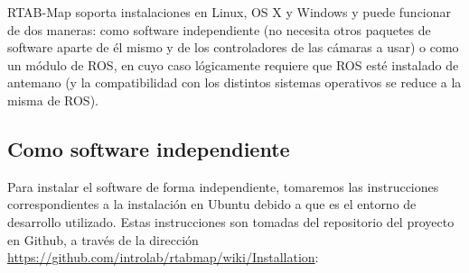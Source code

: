 RTAB-Map soporta instalaciones en Linux, OS X y Windows y puede funcionar de dos maneras: como software independiente (no necesita otros paquetes de software aparte de él mismo y de los controladores de las cámaras a usar) o como un módulo de ROS, en cuyo caso lógicamente requiere que ROS esté instalado de antemano (y la compatibilidad con los distintos sistemas operativos se reduce a la misma de ROS).

\subsection{Como software independiente}

Para instalar el software de forma independiente, tomaremos las instrucciones correspondientes a la instalación en Ubuntu debido a que es el entorno de desarrollo utilizado. Estas instrucciones son tomadas del repositorio del proyecto en Github, a través de la dirección \url{https://github.com/introlab/rtabmap/wiki/Installation}:

